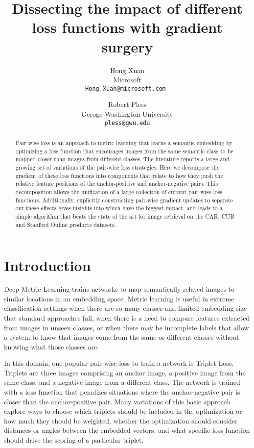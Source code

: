 \documentclass[10pt,twocolumn,letterpaper]{article}
\begin{document}
\title{Dissecting the impact of different loss functions with gradient surgery}

\author{Hong Xuan\\
Microsoft\\
{\tt\small Hong.Xuan@microsoft.com }
\and
Robert Pless\\
Geroge Washington University\\
{\tt\small pless@gwu.edu}
}
\maketitle

\begin{abstract}
   Pair-wise loss is an approach to metric learning that learns a semantic embedding by optimizing a loss function that encourages images from the same semantic class to be mapped closer than images from different classes.  The literature reports a large and growing set of variations of the pair-wise loss strategies. Here we decompose the gradient of these loss functions into components that relate to how they push the relative feature positions of the anchor-positive and anchor-negative pairs.  This decomposition allows the unification of a large collection of current pair-wise loss functions.  Additionally, explicitly constructing pair-wise gradient updates to separate out these effects gives insights into which have the biggest impact, and leads to a simple algorithm that beats the state of the art for image retrieval on the CAR, CUB and Stanford Online products datasets.
\end{abstract}

\section{Introduction}
Deep Metric Learning trains networks to map semantically related images to similar locations in an embedding space.  Metric learning is useful in extreme classification settings when there are so many classes and limited embedding size that standard approaches fail, when there is a need to compare features extracted from images in unseen classes, or when there may be incomplete labels that allow a system to know that images come from the same or different classes without knowing what those classes are.

In this domain, one popular pair-wise loss to train a network is Triplet Loss.  Triplets are three images comprising an anchor image, a positive image from the same class, and a negative image from a different class.  The network is trained with a loss function that penalizes situations where the anchor-negative pair is closer than the anchor-positive pair.  Many variations of this basic approach explore ways to choose which triplets should be included in the optimization or how much they should be weighted, whether the optimization should consider distances or angles between the embedded vectors, and what specific loss function should drive the scoring of a particular triplet.
\end{document}
